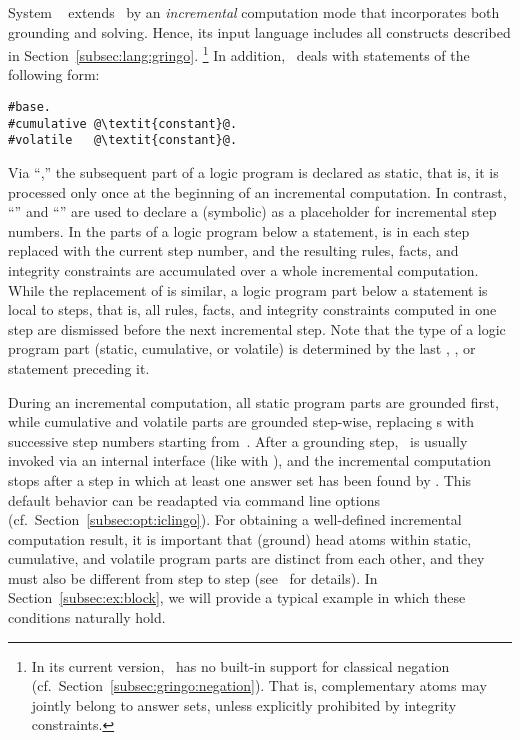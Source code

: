 System \iclingo~\cite{gekakaosscth08a} extends \clingo\ by an
\emph{incremental} computation mode that incorporates both grounding and solving.
Hence, its input language includes all constructs described
in Section~\ref{subsec:lang:gringo}.%
\footnote{%
  In its current version, \iclingo\ has no built-in support for
  classical negation (cf.\ Section~\ref{subsec:gringo:negation}).
  That is, complementary atoms may jointly belong to answer sets,
  unless explicitly prohibited by integrity constraints.}
In addition, \iclingo\ deals with statements of the following form:
%
\begin{lstlisting}[numbers=none,escapechar=@]
#base.
#cumulative @\textit{constant}@.
#volatile   @\textit{constant}@.
\end{lstlisting}
%
Via ``,''
the subsequent part of a logic program is declared as static, that is,
it is processed only once at the beginning of an incremental computation.
In contrast, ``''
and ``'' are used to declare
a (symbolic)  as a placeholder for incremental step numbers.
In the parts of a logic program below a  statement,
 is in each step replaced with the current step number,
and the resulting rules, facts, and integrity constraints are accumulated
over a whole incremental computation.
While the replacement of  is similar,
a logic program part below a  statement is local to steps,
that is, all rules, facts, and integrity constraints computed in one step
are dismissed before the next incremental step.
Note that the type of a logic program part (static, cumulative, or volatile)
is determined by the last
, , or  statement
preceding it.

During an incremental computation, all static program parts are grounded first,
while cumulative and volatile parts are grounded step-wise,
replacing s with successive step numbers starting from~.
After a grounding step, \clasp\ is usually invoked via an internal interface
(like with \clingo), and the incremental computation stops after a step
in which at least one answer set has been found by \clasp.
This default behavior can be readapted via command line 
options (cf.\ Section~\ref{subsec:opt:iclingo}).
For obtaining a well-defined incremental computation result,
it is important that (ground) head atoms within static, cumulative, and volatile program parts
are distinct from each other, and they must also be different from step to step
(see~\cite{gekakaosscth08a} for details).
In Section~\ref{subsec:ex:block},
we will provide a typical example in which these conditions naturally hold.


